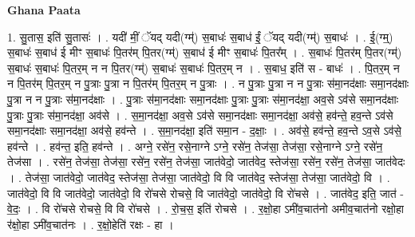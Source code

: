 \documentclass[17pt]{extarticle}
\begin{document}
\textbf{Ghana Paata } \newline

1. सु॒तास॒ इति॑ सु॒तासः॑ । . यदी॑ मीं॒ ॅयद् यदी(ग्म्॑) स॒बाधः॑ स॒बाध॑ ईं॒ ॅयद् यदी(ग्म्॑) स॒बाधः॑ । . ई॒(ग्म्॒) स॒बाधः॑ स॒बाध॑ ई मीꣳ स॒बाधः॑ पि॒तर॑म् पि॒तर(ग्म्॑) स॒बाध॑ ई मीꣳ स॒बाधः॑ पि॒तर᳚म् । . स॒बाधः॑ पि॒तर॑म् पि॒तर(ग्म्॑) स॒बाधः॑ स॒बाधः॑ पि॒तर॒म् न न पि॒तर(ग्म्॑) स॒बाधः॑ स॒बाधः॑ पि॒तर॒म् न । . स॒बाध॒ इति॑ स - बाधः॑ । . पि॒तर॒म् न न पि॒तर॑म् पि॒तर॒म् न पु॒त्राः पु॒त्रा न पि॒तर॑म् पि॒तर॒म् न पु॒त्राः । . न पु॒त्राः पु॒त्रा न न पु॒त्राः स॑मा॒नद॑क्षाः समा॒नद॑क्षाः पु॒त्रा न न पु॒त्राः स॑मा॒नद॑क्षाः । . पु॒त्राः स॑मा॒नद॑क्षाः समा॒नद॑क्षाः पु॒त्राः पु॒त्राः स॑मा॒नद॑क्षा॒ अव॒से ऽव॑से समा॒नद॑क्षाः पु॒त्राः पु॒त्राः स॑मा॒नद॑क्षा॒ अव॑से । . स॒मा॒नद॑क्षा॒ अव॒से ऽव॑से समा॒नद॑क्षाः समा॒नद॑क्षा॒ अव॑से॒ हव॑न्ते॒ हव॒न्ते ऽव॑से समा॒नद॑क्षाः समा॒नद॑क्षा॒ अव॑से॒ हव॑न्ते । . स॒मा॒नद॑क्षा॒ इति॑ समा॒न - द॒क्षाः॒ । . अव॑से॒ हव॑न्ते॒ हव॒न्ते ऽव॒से ऽव॑से॒ हव॑न्ते । . हव॑न्त॒ इति॒ हव॑न्ते । . अग्ने॒ रसे॑न॒ रसे॒नाग्ने ऽग्ने॒ रसे॑न॒ तेज॑सा॒ तेज॑सा॒ रसे॒नाग्ने ऽग्ने॒ रसे॑न॒ तेज॑सा । . रसे॑न॒ तेज॑सा॒ तेज॑सा॒ रसे॑न॒ रसे॑न॒ तेज॑सा॒ जात॑वेदो॒ जात॑वेद॒ स्तेज॑सा॒ रसे॑न॒ रसे॑न॒ तेज॑सा॒ जात॑वेदः । . तेज॑सा॒ जात॑वेदो॒ जात॑वेद॒ स्तेज॑सा॒ तेज॑सा॒ जात॑वेदो॒ वि वि जात॑वेद॒ स्तेज॑सा॒ तेज॑सा॒ जात॑वेदो॒ वि । . जात॑वेदो॒ वि वि जात॑वेदो॒ जात॑वेदो॒ वि रो॑चसे रोचसे॒ वि जात॑वेदो॒ जात॑वेदो॒ वि रो॑चसे । . जात॑वेद॒ इति॒ जात॑ - वे॒दः॒ । . वि रो॑चसे रोचसे॒ वि वि रो॑चसे । . रो॒च॒स॒ इति॑ रोचसे । . र॒क्षो॒हा ऽमी॑व॒चात॑नो अमीव॒चात॑नो रक्षो॒हा र॑क्षो॒हा ऽमी॑व॒चात॑नः । . र॒क्षो॒हेति॑ रक्षः - हा । \newline
\end{document}

